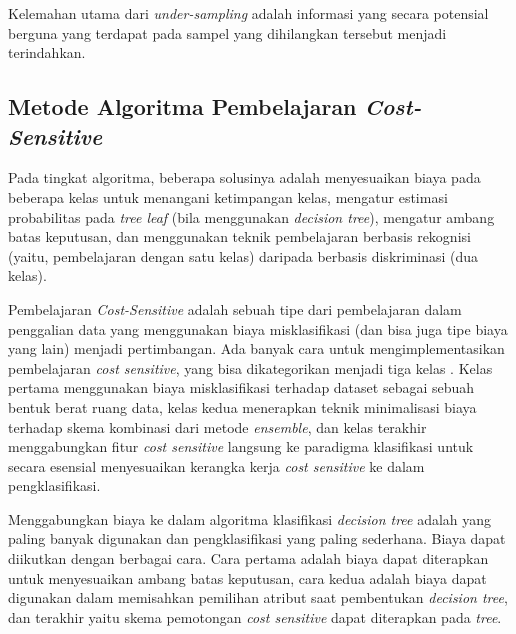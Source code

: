 Kelemahan utama dari \textit{under-sampling} adalah informasi yang secara
potensial berguna yang terdapat pada sampel yang dihilangkan tersebut menjadi
terindahkan.

\label{subsec:algcostsensitive}
\subsection{Metode Algoritma Pembelajaran \textit{Cost-Sensitive}}

Pada tingkat algoritma, beberapa solusinya adalah menyesuaikan biaya pada
beberapa kelas untuk menangani ketimpangan kelas, mengatur estimasi
probabilitas pada \textit{tree leaf} (bila menggunakan \textit{decision tree}),
mengatur ambang batas keputusan, dan menggunakan teknik pembelajaran berbasis
rekognisi (yaitu, pembelajaran dengan satu kelas) daripada berbasis
diskriminasi (dua kelas).

Pembelajaran \textit{Cost-Sensitive} adalah sebuah tipe dari pembelajaran dalam
penggalian data yang menggunakan biaya misklasifikasi (dan bisa juga tipe biaya
yang lain) menjadi pertimbangan.
Ada banyak cara untuk mengimplementasikan pembelajaran \textit{cost sensitive},
yang bisa dikategorikan menjadi tiga kelas \cite{he2009learning}.
Kelas pertama menggunakan biaya misklasifikasi terhadap dataset sebagai sebuah
bentuk berat ruang data, kelas kedua menerapkan teknik minimalisasi biaya
terhadap skema kombinasi dari metode \textit{ensemble}, dan kelas terakhir
menggabungkan fitur \textit{cost sensitive} langsung ke paradigma klasifikasi
untuk secara esensial menyesuaikan kerangka kerja \textit{cost sensitive} ke
dalam pengklasifikasi.

Menggabungkan biaya ke dalam algoritma klasifikasi \textit{decision tree}
adalah yang paling banyak digunakan dan pengklasifikasi yang paling sederhana.
Biaya dapat diikutkan dengan berbagai cara.  Cara pertama adalah biaya dapat
diterapkan untuk menyesuaikan ambang batas keputusan, cara kedua adalah biaya
dapat digunakan dalam memisahkan pemilihan atribut saat pembentukan
\textit{decision tree}, dan terakhir yaitu skema pemotongan \textit{cost
sensitive} dapat diterapkan pada \textit{tree}.
